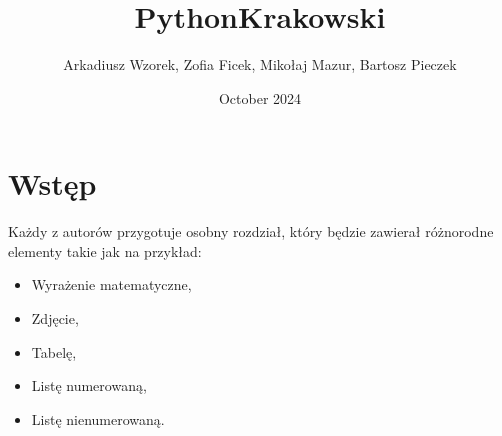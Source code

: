 \documentclass{article}
\title{PythonKrakowski}
\author{Arkadiusz Wzorek, Zofia Ficek, Mikołaj Mazur, Bartosz Pieczek}
\date{October 2024}
\begin{document}
\maketitle

\tableofcontents %

\newpage

\section{Wstęp}

Każdy z autorów przygotuje osobny rozdział, który będzie zawierał różnorodne elementy takie jak na przykład:
\begin{itemize}
    \item Wyrażenie matematyczne,
    \item Zdjęcie,
    \item Tabelę,
    \item Listę numerowaną,
    \item Listę nienumerowaną.
\end{itemize}

\newpage


\pagebreak

\pagebreak

\pagebreak

\pagebreak

\end{document}
